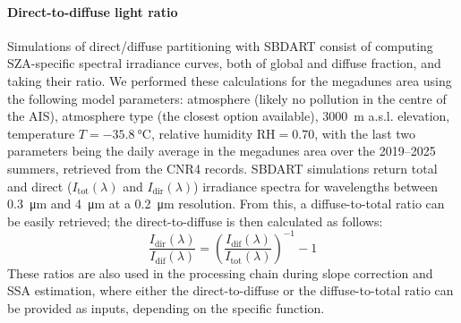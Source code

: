 \documentclass[11pt,a4paper]{article}
\let\oldtexttt\texttt
\renewcommand{\texttt}[1]{\tcbox[boxsep=1pt, left=2pt, right=2pt]{\oldtexttt{#1}}}
\begin{document}
				\paragraph{Direct-to-diffuse light ratio}
Simulations of direct/diffuse partitioning with SBDART consist of computing SZA-specific spectral irradiance curves, both of global and diffuse fraction, and taking their ratio. We performed these calculations for the megadunes area using the following model parameters: \texttt{pristine} atmosphere (likely no pollution in the centre of the AIS), \texttt{sub-arctic winter} atmosphere type (the closest option available), \qty{3000}{\meter} a.s.l. elevation, temperature $T = \qty{-35.8}{\celsius}$, relative humidity $\mathrm{RH} = 0.70$, with the last two parameters being the daily average in the megadunes area over the 2019--2025 summers, retrieved from the CNR4 records. SBDART simulations return total and direct ($I_\mathrm{tot}(\lambda)$ and $I_\mathrm{dir}(\lambda)$) irradiance spectra for wavelengths between \qty{0.3}{\micro\meter} and \qty{4}{\micro\meter} at a \qty{0.2}{\micro\meter} resolution. From this, a diffuse-to-total ratio can be easily retrieved; the direct-to-diffuse is then calculated as follows:
\begin{equation}\label{eq:dirdifftot}
	\frac{I_\mathrm{dir}(\lambda)}{I_\mathrm{dif}(\lambda)} = \left(\frac{I_\mathrm{dif}(\lambda)}{I_\mathrm{tot}(\lambda)}\right)^{-1} -1
\end{equation} 
These ratios are also used in the processing chain during slope correction and SSA estimation, where either the direct-to-diffuse or the diffuse-to-total ratio can be provided as inputs, depending on the specific function.
	
\end{document}
